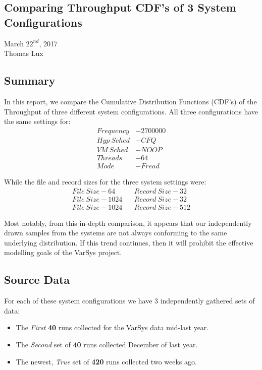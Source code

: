 \documentclass[a4paper,landscape]{article}
\begin{document}
\subsection*{\hfil Comparing Throughput CDF's of 3 System Configurations \hfil}
\begin{center}
  March $22^{nd}$, 2017\\
  Thomas Lux
\end{center}

\subsection*{Summary}

In this report, we compare the Cumulative Distribution Functions
(CDF's) of the Throughput of three different system
configurations. All three configurations have the same settings for:
\begin{align*}
  Frequency  &-  2700000\\
  Hyp\ Sched &-  CFQ\\
  VM\ Sched  &-  NOOP\\
  Threads    &-  64\\
  Mode       &-  Fread
\end{align*}

While the file and record sizes for the three system settings were:
\begin{align}
  File\ Size - 64  \ \  &\ \ Record\ Size - 32\\
  File\ Size - 1024\ \  &\ \ Record\ Size - 32\\
  File\ Size - 1024\ \  &\ \ Record\ Size - 512
\end{align}

Most notably, from this in-depth comparison, it appears that our
independently drawn samples from the systems are not always conforming
to the same underlying distribution. If this trend continues, then it
will prohibit the effective modelling goals of the VarSys project.

\subsection*{Source Data}

For each of these system configurations we have 3 independently
gathered sets of data:
\begin{itemize}
\item The \textit{First} \textbf{40} runs collected for the VarSys data mid-last
  year.
\item The \textit{Second} set of \textbf{40} runs collected December of last year.
\item The newest, \textit{True} set of \textbf{420} runs collected two weeks ago.
\end{itemize}
\end{document}
